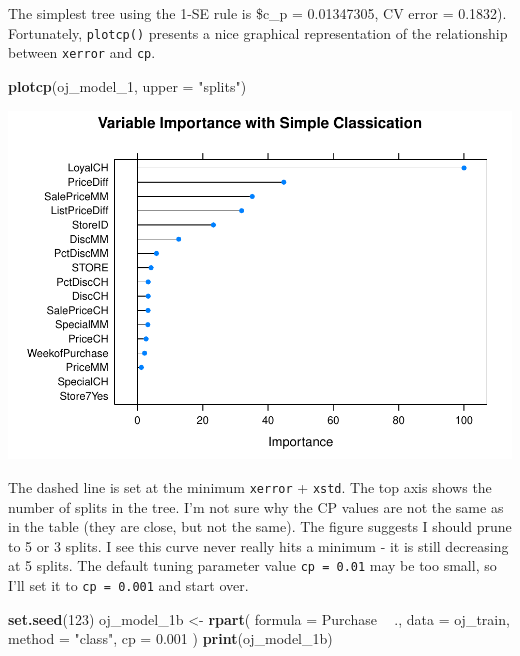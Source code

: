 \documentclass[
]{book}
\newenvironment{Shaded}{\begin{snugshade}}{\end{snugshade}}
\newcommand{\DataTypeTok}[1]{\textcolor[rgb]{0.13,0.29,0.53}{#1}}
\newcommand{\DecValTok}[1]{\textcolor[rgb]{0.00,0.00,0.81}{#1}}
\newcommand{\FloatTok}[1]{\textcolor[rgb]{0.00,0.00,0.81}{#1}}
\newcommand{\KeywordTok}[1]{\textcolor[rgb]{0.13,0.29,0.53}{\textbf{#1}}}
\newcommand{\NormalTok}[1]{#1}
\newcommand{\OperatorTok}[1]{\textcolor[rgb]{0.81,0.36,0.00}{\textbf{#1}}}
\newcommand{\StringTok}[1]{\textcolor[rgb]{0.31,0.60,0.02}{#1}}
\begin{document}
The simplest tree using the 1-SE rule is \$c\_p = 0.01347305, CV error = 0.1832). Fortunately, \texttt{plotcp()} presents a nice graphical representation of the relationship between \texttt{xerror} and \texttt{cp}.

\begin{Shaded}
\begin{Highlighting}[]
\KeywordTok{plotcp}\NormalTok{(oj_model_}\DecValTok{1}\NormalTok{, }\DataTypeTok{upper =} \StringTok{"splits"}\NormalTok{)}
\end{Highlighting}
\end{Shaded}

\includegraphics{data-sci_files/figure-latex/unnamed-chunk-55-1.pdf}

The dashed line is set at the minimum \texttt{xerror} + \texttt{xstd}. The top axis shows the number of splits in the tree. I'm not sure why the CP values are not the same as in the table (they are close, but not the same). The figure suggests I should prune to 5 or 3 splits. I see this curve never really hits a minimum - it is still decreasing at 5 splits. The default tuning parameter value \texttt{cp\ =\ 0.01} may be too small, so I'll set it to \texttt{cp\ =\ 0.001} and start over.

\begin{Shaded}
\begin{Highlighting}[]
\KeywordTok{set.seed}\NormalTok{(}\DecValTok{123}\NormalTok{)}
\NormalTok{oj_model_1b <-}\StringTok{ }\KeywordTok{rpart}\NormalTok{(}
   \DataTypeTok{formula =}\NormalTok{ Purchase }\OperatorTok{~}\StringTok{ }\NormalTok{.,}
   \DataTypeTok{data =}\NormalTok{ oj_train,}
   \DataTypeTok{method =} \StringTok{"class"}\NormalTok{,}
   \DataTypeTok{cp =} \FloatTok{0.001}
\NormalTok{   )}
\KeywordTok{print}\NormalTok{(oj_model_1b)}
\end{Highlighting}
\end{Shaded}
\end{document}
